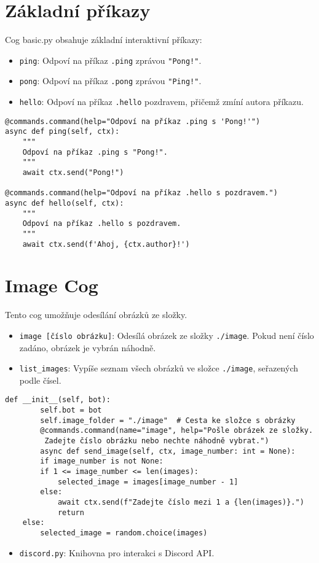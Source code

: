 \documentclass[12pt, a4paper]{report}
\begin{document}
\section{Základní příkazy}
Cog basic.py obsahuje základní interaktivní příkazy:
\begin{itemize}
    \item \texttt{ping}: Odpoví na příkaz \texttt{.ping} zprávou \texttt{"Pong!"}.
    \item \texttt{pong}: Odpoví na příkaz \texttt{.pong} zprávou \texttt{"Ping!"}.
    \item \texttt{hello}: Odpoví na příkaz \texttt{.hello} pozdravem, přičemž zmíní autora příkazu.
\end{itemize}

\begin{lstlisting}[style=Python, caption=Implementace základních příkazů]
@commands.command(help="Odpoví na příkaz .ping s 'Pong!'")
async def ping(self, ctx):
    """
    Odpoví na příkaz .ping s "Pong!".
    """
    await ctx.send("Pong!")

@commands.command(help="Odpoví na příkaz .hello s pozdravem.")
async def hello(self, ctx):
    """
    Odpoví na příkaz .hello s pozdravem.
    """
    await ctx.send(f'Ahoj, {ctx.author}!')
\end{lstlisting}
\section{Image Cog}
Tento cog umožňuje odesílání obrázků ze složky.
\begin{itemize}
    \item \texttt{image [číslo obrázku]}: Odesílá obrázek ze složky \texttt{./image}. Pokud není číslo zadáno, obrázek je vybrán náhodně.
    \item \texttt{list\_images}: Vypíše seznam všech obrázků ve složce \texttt{./image}, seřazených podle čísel.
\end{itemize}
\begin{lstlisting}[style=Python, caption=Ukázka příkazu]    
    def __init__(self, bot):
        self.bot = bot
        self.image_folder = "./image"  # Cesta ke složce s obrázky
        @commands.command(name="image", help="Pošle obrázek ze složky.
         Zadejte číslo obrázku nebo nechte náhodně vybrat.")
        async def send_image(self, ctx, image_number: int = None):
        if image_number is not None:
        if 1 <= image_number <= len(images):
            selected_image = images[image_number - 1]
        else:
            await ctx.send(f"Zadejte číslo mezi 1 a {len(images)}.")
            return
    else:
        selected_image = random.choice(images)
\end{lstlisting}
\begin{itemize}
    \item  \texttt{discord.py}: Knihovna pro interakci s Discord API.
\end{itemize}
\end{document}
